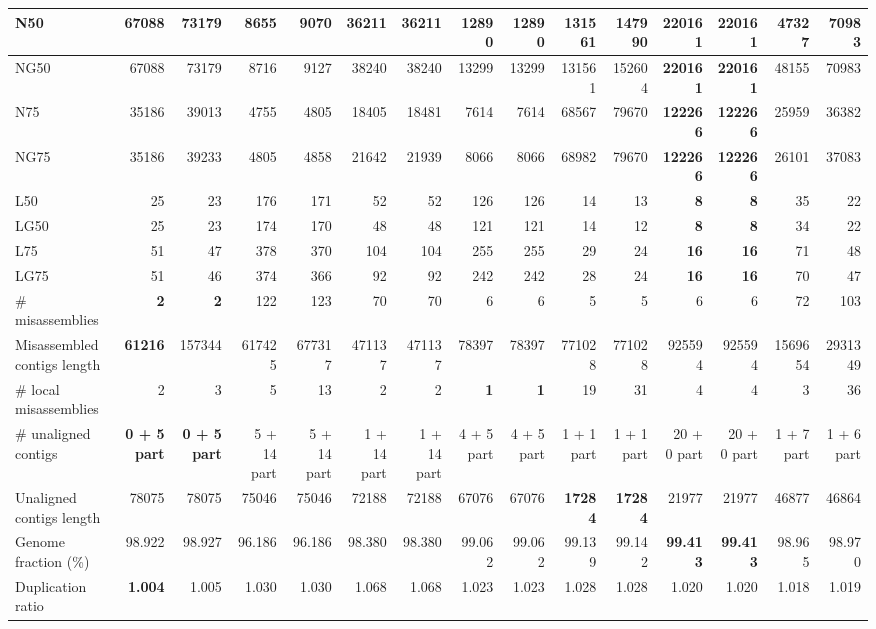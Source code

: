 \documentclass[12pt,a4paper]{article}
\begin{document}
\begin{table}[ht]
\begin{center}
\begin{tabular}{|l*{14}{|r}|}
N50 & 67088 & 73179 & 8655 & 9070 & 36211 & 36211 & 12890 & 12890 & 131561 & 147990 & {\bf 220161} & {\bf 220161} & 47327 & 70983 \\ \hline
NG50 & 67088 & 73179 & 8716 & 9127 & 38240 & 38240 & 13299 & 13299 & 131561 & 152604 & {\bf 220161} & {\bf 220161} & 48155 & 70983 \\ \hline
N75 & 35186 & 39013 & 4755 & 4805 & 18405 & 18481 & 7614 & 7614 & 68567 & 79670 & {\bf 122266} & {\bf 122266} & 25959 & 36382 \\ \hline
NG75 & 35186 & 39233 & 4805 & 4858 & 21642 & 21939 & 8066 & 8066 & 68982 & 79670 & {\bf 122266} & {\bf 122266} & 26101 & 37083 \\ \hline
L50 & 25 & 23 & 176 & 171 & 52 & 52 & 126 & 126 & 14 & 13 & {\bf 8} & {\bf 8} & 35 & 22 \\ \hline
LG50 & 25 & 23 & 174 & 170 & 48 & 48 & 121 & 121 & 14 & 12 & {\bf 8} & {\bf 8} & 34 & 22 \\ \hline
L75 & 51 & 47 & 378 & 370 & 104 & 104 & 255 & 255 & 29 & 24 & {\bf 16} & {\bf 16} & 71 & 48 \\ \hline
LG75 & 51 & 46 & 374 & 366 & 92 & 92 & 242 & 242 & 28 & 24 & {\bf 16} & {\bf 16} & 70 & 47 \\ \hline
\# misassemblies & {\bf 2} & {\bf 2} & 122 & 123 & 70 & 70 & 6 & 6 & 5 & 5 & 6 & 6 & 72 & 103 \\ \hline
Misassembled contigs length & {\bf 61216} & 157344 & 617425 & 677317 & 471137 & 471137 & 78397 & 78397 & 771028 & 771028 & 925594 & 925594 & 1569654 & 2931349 \\ \hline
\# local misassemblies & 2 & 3 & 5 & 13 & 2 & 2 & {\bf 1} & {\bf 1} & 19 & 31 & 4 & 4 & 3 & 36 \\ \hline
\# unaligned contigs & {\bf 0 + 5 part} & {\bf 0 + 5 part} & 5 + 14 part & 5 + 14 part & 1 + 14 part & 1 + 14 part & 4 + 5 part & 4 + 5 part & 1 + 1 part & 1 + 1 part & 20 + 0 part & 20 + 0 part & 1 + 7 part & 1 + 6 part \\ \hline
Unaligned contigs length & 78075 & 78075 & 75046 & 75046 & 72188 & 72188 & 67076 & 67076 & {\bf 17284} & {\bf 17284} & 21977 & 21977 & 46877 & 46864 \\ \hline
Genome fraction (\%) & 98.922 & 98.927 & 96.186 & 96.186 & 98.380 & 98.380 & 99.062 & 99.062 & 99.139 & 99.142 & {\bf 99.413} & {\bf 99.413} & 98.965 & 98.970 \\ \hline
Duplication ratio & {\bf 1.004} & 1.005 & 1.030 & 1.030 & 1.068 & 1.068 & 1.023 & 1.023 & 1.028 & 1.028 & 1.020 & 1.020 & 1.018 & 1.019 \\ \hline

\end{tabular}
\end{center}
\end{table}
\end{document}
